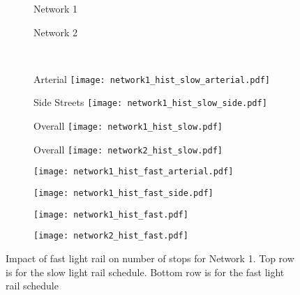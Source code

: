 \begin{figure*}[t!] \centering
%
\begin{subfigure}{0.68\textwidth}
  \centering
  \footnotesize{Network 1}
\end{subfigure}
\begin{subfigure}{0.2\textwidth}
  \centering
  \footnotesize{Network 2}
\end{subfigure}\\[2mm]
\begin{subfigure}{0.275\textwidth}\label{fig:network1_slow:hist:arterial}
  \centering
  \qquad \qquad \footnotesize{Arterial}
\texttt{[image: network1\_hist\_slow\_arterial.pdf]}
\end{subfigure}
%
\begin{subfigure}{0.2\textwidth}\label{fig:network1_slow:hist:side}
  \centering
  \footnotesize{Side Streets}
\texttt{[image: network1\_hist\_slow\_side.pdf]}
\end{subfigure}
%
\begin{subfigure}{0.2\textwidth}\label{fig:network1_slow:hist}
  \centering
  \footnotesize{Overall}
\texttt{[image: network1\_hist\_slow.pdf]}
\end{subfigure}
%
\begin{subfigure}{0.2\textwidth}\label{fig:network2_slow:hist}
  \centering
  \footnotesize{Overall}
\texttt{[image: network2\_hist\_slow.pdf]}
\end{subfigure}
%
\begin{subfigure}{0.28\textwidth}\label{fig:nwrwork1_fast:hist:arterial}
\texttt{[image: network1\_hist\_fast\_arterial.pdf]}
\end{subfigure}
\begin{subfigure}{0.2\textwidth}\label{fig:network1_fast:hist:side}
\texttt{[image: network1\_hist\_fast\_side.pdf]}
\end{subfigure}
\begin{subfigure}{0.2\textwidth}\label{fig:network1_fast:hist}
\texttt{[image: network1\_hist\_fast.pdf]}
\end{subfigure}
\begin{subfigure}{0.2\textwidth}\label{fig:network2_fast:hist}
\texttt{[image: network2\_hist\_fast.pdf]}
\end{subfigure}
\vspace{-2mm}
\caption{Impact of fast light rail on number of stops for Network 1. Top row is for the slow light rail schedule. Bottom row is for the fast light rail schedule}
\label{fig:network_hist}
\end{figure*}

